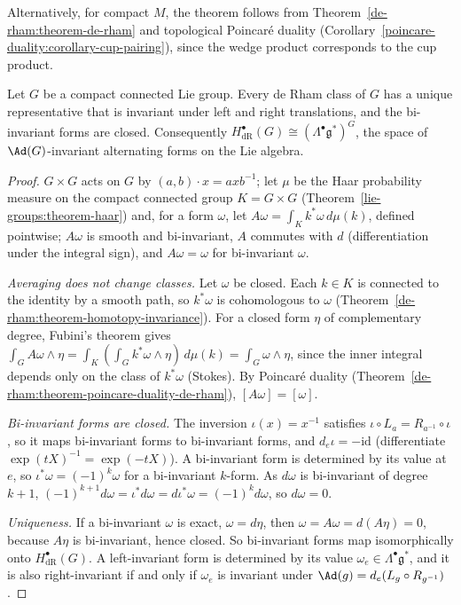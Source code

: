 Alternatively, for compact $M$, the theorem follows from Theorem~\ref{de-rham:theorem-de-rham} and topological Poincar\'e duality (Corollary~\ref{poincare-duality:corollary-cup-pairing}), since the wedge product corresponds to the cup product.

\begin{theorem}\label{de-rham:theorem-lie-group-cohomology}
Let $G$ be a compact connected Lie group. Every de Rham class of $G$ has a unique representative that is invariant under left and right translations, and the bi-invariant forms are closed. Consequently
$H^\bullet_{\mathrm{dR}}(G) \cong (\Lambda^\bullet\mathfrak{g}^*)^{G}$, the space of $\Ad(G)$-invariant alternating forms on the Lie algebra.
\end{theorem}

\begin{proof}
$G \times G$ acts on $G$ by $(a, b) \cdot x = axb^{-1}$; let $\mu$ be the Haar probability measure on the compact connected group $K = G \times G$ (Theorem~\ref{lie-groups:theorem-haar}) and, for a form $\omega$, let
$A\omega = \int_Kk^*\omega\,d\mu(k)$, defined pointwise; $A\omega$ is smooth and bi-invariant, $A$ commutes with $d$ (differentiation under the integral sign), and $A\omega = \omega$ for bi-invariant $\omega$.

\emph{Averaging does not change classes.} Let $\omega$ be closed. Each $k \in K$ is connected to the identity by a smooth path, so $k^*\omega$ is cohomologous to $\omega$ (Theorem~\ref{de-rham:theorem-homotopy-invariance}). For a closed form $\eta$
of complementary degree, Fubini's theorem gives $\int_GA\omega \wedge \eta = \int_K(\int_Gk^*\omega \wedge \eta)\,d\mu(k) = \int_G\omega \wedge \eta$, since the inner integral depends only on the class of $k^*\omega$ (Stokes). By Poincar\'e duality
(Theorem~\ref{de-rham:theorem-poincare-duality-de-rham}), $[A\omega] = [\omega]$.

\emph{Bi-invariant forms are closed.} The inversion $\iota(x) = x^{-1}$ satisfies $\iota \circ L_a = R_{a^{-1}} \circ \iota$, so it maps bi-invariant forms to bi-invariant forms, and $d_e\iota = -\mathrm{id}$ (differentiate $\exp(tX)^{-1} = \exp(-tX)$).
A bi-invariant form is determined by its value at $e$, so $\iota^*\omega = (-1)^k\omega$ for a bi-invariant $k$-form. As $d\omega$ is bi-invariant of degree $k + 1$, $(-1)^{k+1}d\omega = \iota^*d\omega = d\iota^*\omega = (-1)^kd\omega$, so $d\omega = 0$.

\emph{Uniqueness.} If a bi-invariant $\omega$ is exact, $\omega = d\eta$, then $\omega = A\omega = d(A\eta) = 0$, because $A\eta$ is bi-invariant, hence closed. So bi-invariant forms map isomorphically onto $H^\bullet_{\mathrm{dR}}(G)$. A
left-invariant form is determined by its value $\omega_e \in \Lambda^\bullet\mathfrak{g}^*$, and it is also right-invariant if and only if $\omega_e$ is invariant under $\Ad(g) = d_e(L_g \circ R_{g^{-1}})$.
\end{proof}

